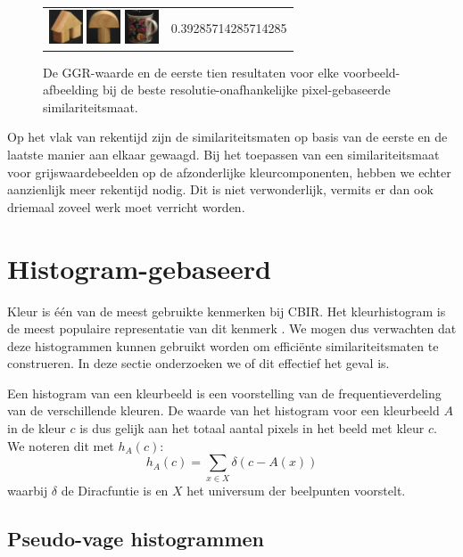 \begin{figure}[tbp]
\begin{center}
\begin{tabular}{m{11cm} | m{3cm} |}
\includegraphics[width=1cm]{coil/beeld-45.eps}
\includegraphics[width=1cm]{coil/beeld-0.eps}
\includegraphics[width=1cm]{coil/beeld-64.eps}
& {\scriptsize 0.39285714285714285}
\end{tabular}
\caption{\label{fig:results_beste_pixelgeb}De GGR-waarde en de eerste tien resultaten voor elke voorbeeld-afbeelding bij de beste resolutie-onafhankelijke pixel-gebaseerde similariteitsmaat.}
\end{center}
\end{figure}

Op het vlak van rekentijd zijn de similariteitsmaten op basis van de eerste en de laatste manier
aan elkaar gewaagd. Bij het toepassen van een similariteitsmaat voor grijswaardebeelden op de 
afzonderlijke kleurcomponenten, hebben we echter aanzienlijk meer rekentijd nodig. Dit is niet
verwonderlijk, vermits er dan ook driemaal zoveel werk moet verricht worden.


\section{Histogram-gebaseerd}

Kleur is \'e\'en van de meest gebruikte kenmerken bij CBIR. Het kleurhistogram is de meest 
populaire representatie van dit kenmerk \cite{rui:image_retr}. We mogen dus verwachten
dat deze histogrammen kunnen gebruikt worden om effici\"ente similariteitsmaten te construeren.
In deze sectie onderzoeken we of dit effectief het geval is. 

Een histogram van een kleurbeeld is een voorstelling van de frequentieverdeling van de
verschillende kleuren. De waarde van het histogram voor een kleurbeeld $A$ in de kleur $c$ is
dus gelijk aan het totaal aantal pixels in het beeld met kleur $c$. We noteren dit met $h_A(c)$:
$$
h_A(c) = \sum_{x \in X} \delta (c - A(x))
$$
waarbij $\delta$ de Diracfuntie is en $X$ het universum der beelpunten voorstelt. 


\subsection{Pseudo-vage histogrammen}

